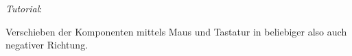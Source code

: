 \emph{Tutorial}: 

Verschieben der Komponenten mittels Maus und Tastatur in beliebiger also auch
negativer Richtung.
